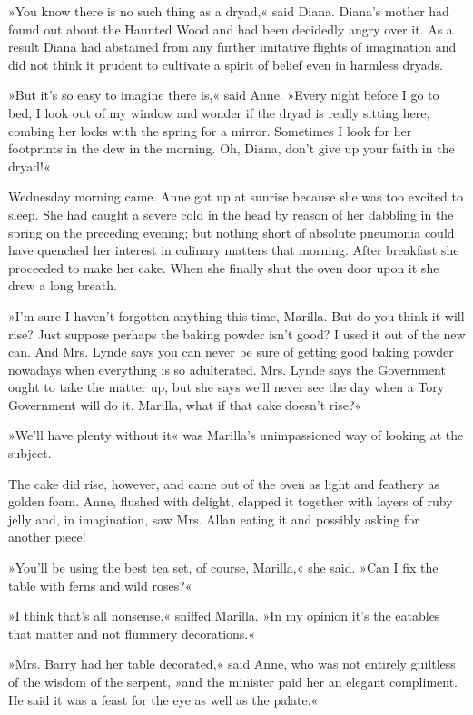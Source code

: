 »You know there is no such thing as a dryad,« said Diana. Diana’s mother had found out about the Haunted Wood and had been decidedly angry over it. As a result Diana had abstained from any further imitative flights of imagination and did not think it prudent to cultivate a spirit of belief even in harmless dryads.

»But it’s so easy to imagine there is,« said Anne. »Every night before I go to bed, I look out of my window and wonder if the dryad is really sitting here, combing her locks with the spring for a mirror. Sometimes I look for her footprints in the dew in the morning. Oh, Diana, don’t give up your faith in the dryad!«

Wednesday morning came. Anne got up at sunrise because she was too excited to sleep. She had caught a severe cold in the head by reason of her dabbling in the spring on the preceding evening; but nothing short of absolute pneumonia could have quenched her interest in culinary matters that morning. After breakfast she proceeded to make her cake. When she finally shut the oven door upon it she drew a long breath.

»I’m sure I haven’t forgotten anything this time, Marilla. But do you think it will rise? Just suppose perhaps the baking powder isn’t good? I used it out of the new can. And Mrs. Lynde says you can never be sure of getting good baking powder nowadays when everything is so adulterated. Mrs. Lynde says the Government ought to take the matter up, but she says we’ll never see the day when a Tory Government will do it. Marilla, what if that cake doesn’t rise?«

»We’ll have plenty without it« was Marilla’s unimpassioned way of looking at the subject.

The cake did rise, however, and came out of the oven as light and feathery as golden foam. Anne, flushed with delight, clapped it together with layers of ruby jelly and, in imagination, saw Mrs. Allan eating it and possibly asking for another piece!

»You’ll be using the best tea set, of course, Marilla,« she said. »Can I fix the table with ferns and wild roses?«

»I think that’s all nonsense,« sniffed Marilla. »In my opinion it’s the eatables that matter and not flummery decorations.«

»Mrs. Barry had her table decorated,« said Anne, who was not entirely guiltless of the wisdom of the serpent, »and the minister paid her an elegant compliment. He said it was a feast for the eye as well as the palate.«

